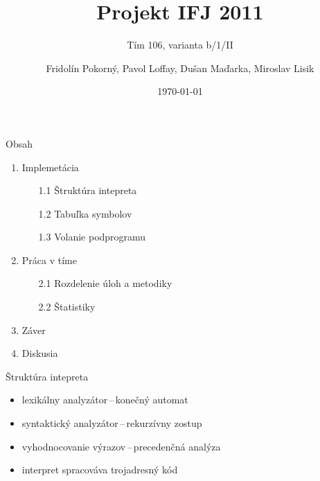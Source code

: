 \documentclass[pdf,fyma2,total]{prosper}
\begin{document}
\begin{titlepage}
  \title{Projekt IFJ 2011}
  \subtitle{Tím 106, varianta b/1/II}
  \author{Fridolín Pokorný, Pavol Loffay, Dušan Maďarka, Miroslav Lisik}
  \date{\today}
  \maketitle
\end{titlepage}


\begin{slide}{Obsah}
\begin{small}

    \medskip
    \begin{enumerate}
        \item{Implemetácia}
            \begin{enumerate}
                \item[1.1]{Štruktúra intepreta}
                \item[1.2]{Tabuľka symbolov}
                \item[1.3]{Volanie podprogramu}
            \end{enumerate}

        \item{Práca v tíme} 
            \begin{enumerate}
                \item[2.1]{Rozdelenie úloh a metodiky}
                \item[2.2]{Štatistiky}
            \end{enumerate}

        \item{Záver}

        \item{Diskusia}

    \end{enumerate}

\end{small}
\end{slide}


\begin{slide}{Štruktúra intepreta}
\begin{small}

    \bigskip
    \begin{itemize}
        \item{lexikálny analyzátor\,--\,konečný automat}
        \bigskip
        \item{syntaktický analyzátor\,--\,rekurzívny zostup}
        \bigskip
        \item{vyhodnocovanie výrazov\,--\,precedenčná analýza}
        \bigskip
        \item{interpret spracováva trojadresný kód}
    \end{itemize}

\end{small}
\end{slide}
\end{document}
